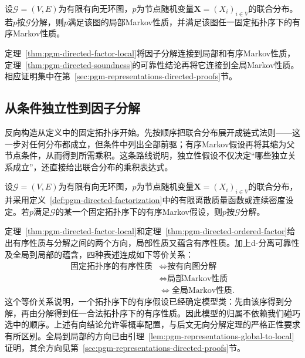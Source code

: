 \begin{theorem}[分解蕴含局部与有序Markov性质]
  \label{thm:pgm-directed-factor-local}
  设$\mathcal{G}=(V,E)$为有限有向无环图，$p$为节点随机变量$\bm{X}=(X_i)_{i\in V}$的联合分布。若$p$按$\mathcal{G}$分解，则$p$满足该图的局部Markov性质，并满足该图任一固定拓扑序下的有序Markov性质。
\end{theorem}

定理~\ref{thm:pgm-directed-factor-local}将因子分解连接到局部和有序Markov性质，定理~\ref{thm:pgm-directed-soundness}的可靠性结论再将它连接到全局Markov性质。相应证明集中在第~\ref{sec:pgm-representations-directed-proofs}节。

\subsection{从条件独立性到因子分解}
\label{sec:pgm-directed-ci-to-factor}

反向构造从定义中的固定拓扑序开始。先按顺序把联合分布展开成链式法则——这一步对任何分布都成立，但条件中列出全部前驱；有序Markov假设再将其缩为父节点条件，从而得到所需乘积。这条路线说明，独立性假设不仅决定“哪些独立关系成立”，还直接给出联合分布的乘积表达式。

\begin{theorem}[有序假设导出有向分解]
  \label{thm:pgm-directed-ordered-factor}
  设$\mathcal{G}=(V,E)$为有限有向无环图，$p$为节点随机变量$\bm{X}=(X_i)_{i\in V}$的联合分布，并采用定义~\ref{def:pgm-directed-factorization}中的有限离散质量函数或连续密度设定。若$p$满足$\mathcal{G}$的某一个固定拓扑序下的有序Markov假设，则$p$按$\mathcal{G}$分解。
\end{theorem}

定理~\ref{thm:pgm-directed-factor-local}和定理~\ref{thm:pgm-directed-ordered-factor}给出有序性质与分解之间的两个方向，局部性质又蕴含有序性质。加上d-分离可靠性及全局到局部的蕴含，四种表述连成如下等价关系：
\begin{equation}
  \begin{aligned}
    \text{固定拓扑序的有序性质}
      &\Longleftrightarrow \text{按有向图分解}\\
      &\Longleftrightarrow \text{局部Markov性质}\\
      &\Longleftrightarrow \text{全局Markov性质}.
  \end{aligned}
  \label{eq:pgm-directed-equivalence}
\end{equation}
这个等价关系说明，一个拓扑序下的有序假设已经确定模型类：先由该序得到分解，再由分解得到任一合法拓扑序下的有序性质。因此模型的归属不依赖我们碰巧选中的顺序。上述有向结论允许零概率配置，与后文无向分解定理的严格正性要求有所区别。全局到局部的方向已由引理~\ref{lem:pgm-representations-global-to-local}证明，其余方向见第~\ref{sec:pgm-representations-directed-proofs}节。

